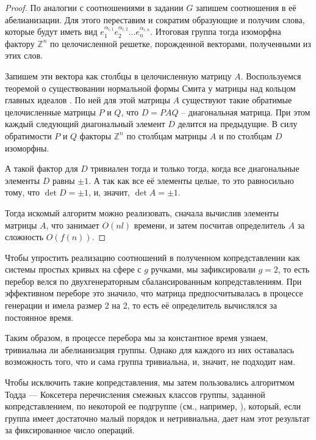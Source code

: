 \documentclass[a4paper, 12pt]{article}
\theoremstyle{definition}
\begin{document}
    \begin{proof}
        По аналогии с соотношениями в задании $G$ запишем соотношения в её абелианизации. Для этого переставим и сократим образующие и получим слова, которые будут иметь вид $e_1^{\alpha_{i, 1}} e_2^{\alpha_{i, 2}} \dots e_n^{\alpha_{i, n}}$. Итоговая группа тогда изоморфна фактору $\mathbb{Z}^n$ по целочисленной решетке, порожденной векторами, полученными из этих слов.

        Запишем эти вектора как столбцы в целочисленную матрицу $A$. Воспользуемся теоремой о существовании нормальной формы Смита у матрицы над кольцом главных идеалов \cite[Chapter 3, Theorem 7.9]{Lang2002}. По ней для этой матрицы $A$ существуют такие обратимые целочисленные матрицы $P$ и $Q$, что $D = P A Q$ -- диагональная матрица. При этом каждый следующий диагональный элемент $D$ делится на предыдущие. В силу обратимости $P$ и $Q$ факторы $\mathbb{Z}^n$ по столбцам матрицы $A$ и по столбцам $D$ изоморфны.

        А такой фактор для $D$ тривиален тогда и только тогда, когда все диагональные элементы $D$ равны $\pm 1$. А так как все её элементы целые, то это равносильно тому, что $\det D = \pm 1$, и, значит, $\det A = \pm 1$.

        Тогда искомый алгоритм можно реализовать, сначала вычислив элементы матрицы $A$, что занимает $O(n l)$ времени, и затем посчитав определитель $A$ за сложность $O(f(n))$.
    \end{proof}

    Чтобы упростить реализацию соотношений в полученном копредставлении как системы простых кривых на сфере с $g$ ручками, мы зафиксировали $g = 2$, то есть перебор велся по двухгенераторным сбалансированным копредставлениям. При эффективном переборе это значило, что матрица предпосчитывалась в процессе генерации и имела размер 2 на 2, то есть её определитель вычислялся за постоянное время. 

    Таким образом, в процессе перебора мы за константное время узнаем, тривиальна ли абелианизация группы. Однако для каждого из них оставалась возможность того, что и сама группа тривиальна, и, значит, не подходит нам.

    Чтобы исключить такие копредставления, мы затем пользовались алгоритмом Тодда — Коксетера перечисления смежных классов группы, заданной копредставлением, по некоторой ее подгруппе (см., например, \cite[Chapter 5]{Holt2005}), который, если группа имеет достаточно малый порядок и нетривиальна, дает нам этот результат за фиксированное число операций.
\end{document}
